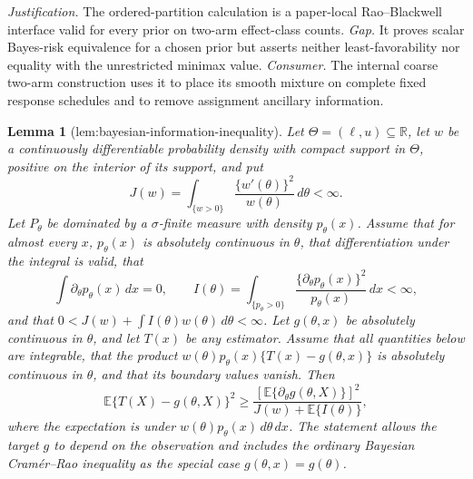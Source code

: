 \documentclass{article}
\newtheorem{lemma}{Lemma}
\begin{document}
\par\smallskip\noindent \textit{Justification.} The ordered-partition calculation is a paper-local Rao--Blackwell interface valid for every prior on two-arm effect-class counts. \textit{Gap.} It proves scalar Bayes-risk equivalence for a chosen prior but asserts neither least-favorability nor equality with the unrestricted minimax value. \textit{Consumer.} The internal coarse two-arm construction uses it to place its smooth mixture on complete fixed response schedules and to remove assignment ancillary information.

\begin{lemma}[lem:bayesian-information-inequality]\label{lem:bayesian-information-inequality}
Let \(\Theta=(\ell,u)\subseteq\mathbb R\), let \(w\) be a continuously differentiable probability density with compact support in \(\Theta\), positive on the interior of its support, and put
\[
 J(w)=\int_{\{w>0\}}\frac{\{w'(\theta)\}^2}{w(\theta)}\,d\theta<\infty.
\]
Let \(P_\theta\) be dominated by a \(\sigma\)-finite measure with density \(p_\theta(x)\). Assume that for almost every \(x\), \(p_\theta(x)\) is absolutely continuous in \(\theta\), that differentiation under the integral is valid, that
\[
 \int \partial_\theta p_\theta(x)\,dx=0,
 \qquad
 I(\theta)=\int_{\{p_\theta>0\}}
 \frac{\{\partial_\theta p_\theta(x)\}^2}{p_\theta(x)}\,dx<\infty,
\]
and that \(0<J(w)+\int I(\theta)w(\theta)\,d\theta<\infty\). Let \(g(\theta,x)\) be absolutely continuous in \(\theta\), and let \(T(x)\) be any estimator. Assume that all quantities below are integrable, that the product \(w(\theta)p_\theta(x)\{T(x)-g(\theta,x)\}\) is absolutely continuous in \(\theta\), and that its boundary values vanish. Then
\[
 \mathbb E\{T(X)-g(\theta,X)\}^2
 \geq
 \frac{\left[\mathbb E\{\partial_\theta g(\theta,X)\}\right]^2}
 {J(w)+\mathbb E\{I(\theta)\}},
\]
where the expectation is under \(w(\theta)p_\theta(x)\,d\theta\,dx\). The statement allows the target \(g\) to depend on the observation and includes the ordinary Bayesian Cram\'er--Rao inequality as the special case \(g(\theta,x)=g(\theta)\).
\end{lemma}
\end{document}
